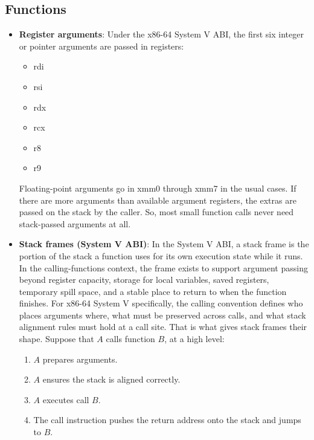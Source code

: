 \documentclass{report}
\begin{document}
        \subsection{Functions}
        \begin{itemize}
            \item \textbf{Register arguments}: Under the x86-64 System V ABI, the first six integer or pointer arguments are passed in registers:
                \begin{itemize}
                    \item rdi
                    \item rsi
                    \item rdx
                    \item rcx
                    \item r8
                    \item r9
                \end{itemize}
                Floating-point arguments go in xmm0 through xmm7 in the usual cases. If there are more arguments than available argument registers, the extras are passed on the stack by the caller. So, most small function calls never need stack-passed arguments at all.
            \item \textbf{Stack frames (System V ABI)}:  In the System V ABI, a stack frame is the portion of the stack a function uses for its own execution state while it runs. In the calling-functions context, the frame exists to support argument passing beyond register capacity, storage for local variables, saved registers, temporary spill space, and a stable place to return to when the function finishes.
                \bigbreak \noindent 
                For x86-64 System V specifically, the calling convention defines who places arguments where, what must be preserved across calls, and what stack alignment rules must hold at a call site. That is what gives stack frames their shape.
                \bigbreak \noindent 
                Suppose that $A$ calls function $B$, at a high level:
                \begin{enumerate}
                    \item $A$ prepares arguments.
                    \item $A$ ensures the stack is aligned correctly.
                    \item $A$ executes call $B$.
                    \item The call instruction pushes the return address onto the stack and jumps to $B$.

\end{enumerate}
\end{itemize}
\end{document}
